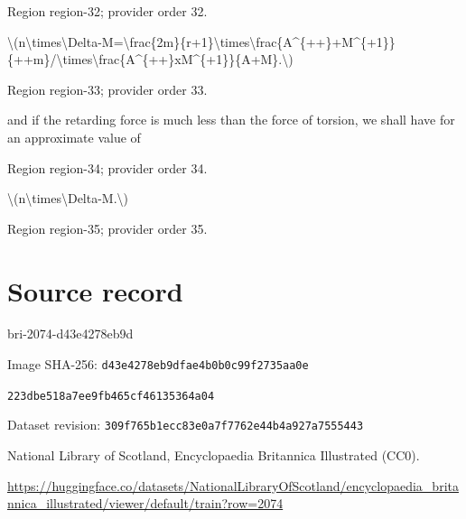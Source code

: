\documentclass[11pt]{article}
\begin{document}
{\scriptsize\color{gray} Region region-32; provider order 32.\par}
\medskip

\textbackslash{}(n\textbackslash{}times\textbackslash{}Delta-M=\textbackslash{}frac\{2m\}\{r+1\}\textbackslash{}times\textbackslash{}frac\{A\textasciicircum{}\{++\}+M\textasciicircum{}\{+1\}\}\{++m\}/\textbackslash{}times\textbackslash{}frac\{A\textasciicircum{}\{++\}xM\textasciicircum{}\{+1\}\}\{A+M\}.\textbackslash{})
\par

{\scriptsize\color{gray} Region region-33; provider order 33.\par}
\medskip

and if the retarding force is much less than the force of torsion, we shall have for an approximate value of
\par

{\scriptsize\color{gray} Region region-34; provider order 34.\par}
\medskip

\textbackslash{}(n\textbackslash{}times\textbackslash{}Delta-M.\textbackslash{})
\par

{\scriptsize\color{gray} Region region-35; provider order 35.\par}
\medskip
\newpage\section*{Source record}
bri-2074-d43e4278eb9d\par
Image SHA-256: \texttt{d43e4278eb9dfae4b0b0c99f2735aa0e}\par\texttt{223dbe518a7ee9fb465cf46135364a04}\par
Dataset revision: \texttt{309f765b1ecc83e0a7f7}\texttt{762e44b4a927a7555443}\par
National Library of Scotland, Encyclopaedia Britannica Illustrated (CC0).\par
\url{https://huggingface.co/datasets/NationalLibraryOfScotland/encyclopaedia_britannica_illustrated/viewer/default/train?row=2074}
\end{document}

